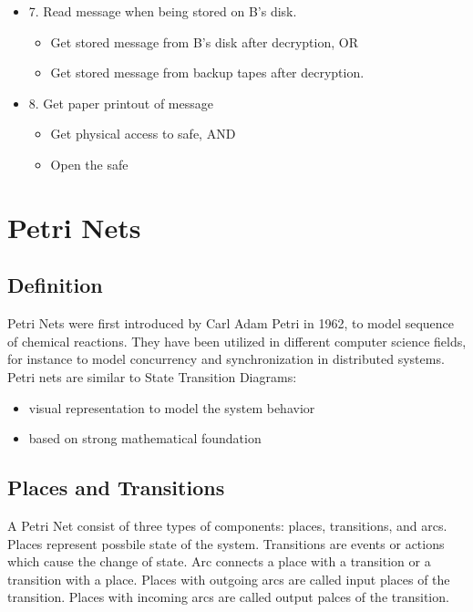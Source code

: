\begin{itemize}
\begin{itemize}
        \end{itemize}
    \item 7. Read message when being stored on B’s disk.
        \begin{itemize}
            \item Get stored message from B’s disk after decryption, OR
            \item Get stored message from backup tapes after decryption.
        \end{itemize}
    \item 8. Get paper printout of message
        \begin{itemize}
            \item Get physical access to safe, AND
            \item Open the safe
        \end{itemize}
\end{itemize}

\section{Petri Nets}

\subsection{Definition}

Petri Nets were first introduced by Carl Adam Petri in 1962, to model sequence of chemical reactions. They have been utilized in different computer science fields, for instance to model concurrency and synchronization in distributed systems. 
Petri nets are similar to State Transition Diagrams:
\begin{itemize}
    \item visual representation to model the system behavior
    \item based on strong mathematical foundation
\end{itemize}

\subsection{Places and Transitions}

A Petri Net consist of three types of components: places, transitions, and arcs.\newline
Places represent possbile state of the system.\newline
Transitions are events or actions which cause the change of state.\newline
Arc connects a place with a transition or a transition with a place. 
Places with outgoing arcs are called input places of the transition. 
Places with incoming arcs are called output palces of the transition. 

